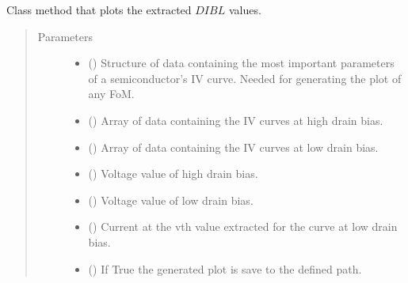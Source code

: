\documentclass[letterpaper,10pt,english,openany, oneside]{sphinxmanual}
\begin{document}
\begin{fulllineitems}
\begin{fulllineitems}
\end{fulllineitems}


\begin{fulllineitems}
\label{\detokenize{index:fompy.fom.dibl_ext.plot}}
Class method that plots the extracted \(DIBL\) values.
\begin{quote}\begin{description}
\item[{Parameters}] \leavevmode\begin{itemize}
\item {} 
 () \textendash{} Structure of data containing the most important parameters of a semiconductor’s IV curve.
Needed for generating the plot of any FoM.

\item {} 
 () \textendash{} Array of data containing the IV curves at high drain bias.

\item {} 
 () \textendash{} Array of data containing the IV curves at low drain bias.

\item {} 
 () \textendash{} Voltage value of high drain bias.

\item {} 
 () \textendash{} Voltage value of low drain bias.

\item {} 
 () \textendash{} Current at the vth value extracted for the curve at low drain bias.

\item {} 
 () \textendash{} If True the generated plot is save to the defined path.


\end{itemize}
\end{description}
\end{quote}
\end{fulllineitems}
\end{fulllineitems}
\end{document}
